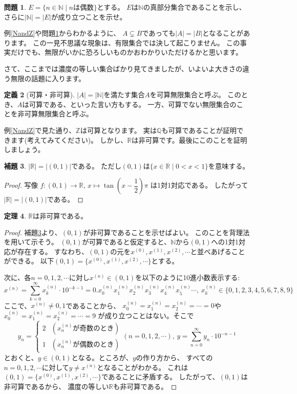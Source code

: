 \documentclass[./main]{subfiles} %
\theoremstyle{definition}
\newtheorem{defi}{定義}[section]
\newtheorem{qst}[defi]{問題}
\newtheorem{thm}[defi]{定理}
\newtheorem{lem}[defi]{補題}
\begin{document}
\begin{qst}
\label{Nand2N}
$E=\{n\in\mathbb{N}\mid nは偶数\}$とする。
$E$は$\mathbb{N}$の真部分集合であることを示し、
さらに$|\mathbb{N}|=|E|$が成り立つことを示せ。
\end{qst}

例\ref{NandZ}や問題\ref{Nand2N}からわかるように、
$A\subsetneq B$であっても$|A|=|B|$となることがあります。
この一見不思議な現象は、有限集合では決して起こりません。
この事実だけでも、無限がいかに恐ろしいものかおわかりいただけるかと思います。

さて、ここまでは濃度の等しい集合ばかり見てきましたが、いよいよ大きさの違う無限の話題に入ります。

\begin{defi}[可算・非可算]
$|A|=|\mathbb{N}|$を満たす集合$A$を可算無限集合と呼ぶ。
このとき、$A$は可算である、といった言い方もする。
一方、可算でない無限集合のことを非可算無限集合と呼ぶ。
\end{defi}

例\ref{NandZ}で見た通り、$\mathbb{Z}$は可算となります。
実は$\mathbb{Q}$も可算であることが証明できます(考えてみてください)。
しかし、$\mathbb{R}$は非可算です。最後にこのことを証明しましょう。

\begin{lem}
\label{real01}
$|\mathbb{R}|=|(0,1)|$である。
ただし$(0,1)$は$\{x\in\mathbb{R}\mid0<x<1\}$を意味する。
\end{lem}
\begin{proof}
写像
$f\colon(0,1)\to\mathbb{R}$, $x\mapsto\tan\left(x-\dfrac{1}{2}\right)\pi$
は1対1対応である。
したがって$|\mathbb{R}|=|(0,1)|$である。
\end{proof}

\begin{thm}
\label{cantor}
$\mathbb{R}$は非可算である。
\end{thm}
\begin{proof}
補題\ref{real01}より、$(0,1)$が非可算であることを示せばよい。
このことを背理法を用いて示そう。
$(0,1)$が可算であると仮定すると、$\mathbb{N}$から$(0,1)$への1対1対応が存在する。
すなわち、$(0,1)$の元を$x^{(0)},x^{(1)},x^{(2)},\cdots$と並べあげることができる。
以下$(0,1)=\{x^{(0)},x^{(1)},x^{(2)},\cdots\}$とする。

次に、各$n=0,1,2,\cdots$に対し$x^{(n)}\in(0,1)$を以下のように10進小数表示する:
\[
x^{(n)}=\sum_{k=0}^\infty x_k^{(n)}\cdot10^{-k-1}
=0.x_0^{(n)}x_1^{(n)}x_2^{(n)}x_3^{(n)}x_4^{(n)}x_5^{(n)}\cdots,\ 
x_k^{(n)}\in\{0,1,2,3,4,5,6,7,8,9\}
\]
ここで、$x^{(n)}\neq0,1$であることから、
$x_0^{(n)}=x_1^{(n)}=x_2^{(n)}=\cdots=0$や$x_0^{(n)}=x_1^{(n)}=x_2^{(n)}=\cdots=9$
が成り立つことはない。そこで
\[
y_n=
\begin{cases}
2 & (x_n^{(n)}が奇数のとき)\\
1 & (x_n^{(n)}が偶数のとき)
\end{cases}
(n=0,1,2,\cdots),\ 
y=\sum_{n=0}^\infty y_n\cdot10^{-n-1}
\]
とおくと、$y\in(0,1)$となる。ところが、$y$の作り方から、
すべての$n=0,1,2,\cdots$に対して$y\neq x^{(n)}$となることがわかる。
これは$(0,1)=\{x^{(0)},x^{(1)},x^{(2)},\cdots\}$であることに矛盾する。
したがって、$(0,1)$は非可算であるから、
濃度の等しい$\mathbb{R}$も非可算である。
\end{proof}
\end{document}
